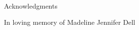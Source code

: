 \newpage

\vspace{3in}

\begin{center}
\begin{Large}
\begin{bfseries}
Acknowledgments
\end{bfseries}
\end{Large}
\end{center}

\vspace{0.5in}


\vspace{1.0in}
In loving memory of Madeline Jennifer Dell



